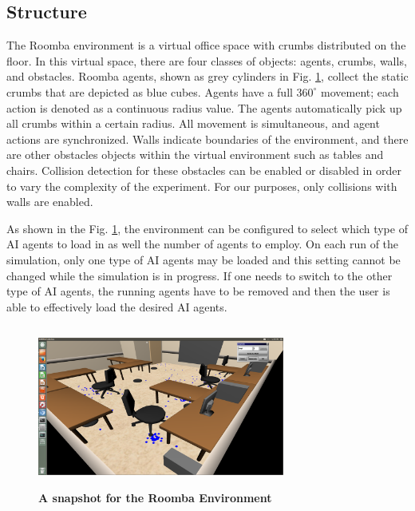 \documentclass[conference]{IEEEtran}
\begin{document}
\subsection{Structure}

The Roomba environment is a virtual office space with crumbs distributed on
the floor.
In this virtual space, there are four classes of objects: agents, crumbs, walls,
and obstacles. 
Roomba agents, shown as grey cylinders in Fig. \ref{roomba:world}, collect the static crumbs that are depicted as blue cubes.  
Agents have a full $360^\circ$ movement; each action is
denoted as a continuous radius value. The
agents automatically pick up all crumbs within a certain radius.
All movement is simultaneous, and agent actions are synchronized.  
Walls indicate boundaries of the environment, and there are other obstacles objects within the virtual environment such as tables and chairs. Collision detection for these obstacles can be enabled or disabled in order to vary the complexity of the experiment. For our purposes, only collisions with walls are enabled.

As shown in the Fig. \ref{roomba:world}, the environment can be configured to select which type of AI agents to load in as well the
number of agents to employ. On each run of the
simulation, only one type of AI agents may be loaded and this setting cannot be changed while the simulation is in progress. 
If one needs to switch to the other type of AI agents, the running agents have
to be removed and then the user is able to effectively load the desired AI agents.

\begin{figure}[!t]
\centering
\includegraphics[width=3.2in,height=2.1in]{./figures/roombas/roomba2.png}
\caption{\textbf{A snapshot for the Roomba Environment}}
\label{roomba:world}
\end{figure}
\end{document}
